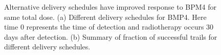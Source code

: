 \documentclass[
  letterpaper,
]{scrreprt}
\theoremstyle{definition}
\theoremstyle{remark}
\begin{document}
\begin{figure}

\begin{minipage}{0.50\linewidth}


\subcaption{\label{fig-delivery_schedule}}

\end{minipage}%
%
\begin{minipage}{0.50\linewidth}


\subcaption{\label{fig-delivery_schedule_frac_succ}}

\end{minipage}%

\caption{\label{fig-delivery_schedule_frac_succ_overall}Alternative
delivery schedules have improved response to BPM4 for same total dose.
(a) Different delivery schedules for BMP4. Here time 0 represents the
time of detection and radiotherapy occurs 30 days after detection. (b)
Summary of fraction of successful trails for different delivery
schedules.}

\end{figure}%
\end{document}

